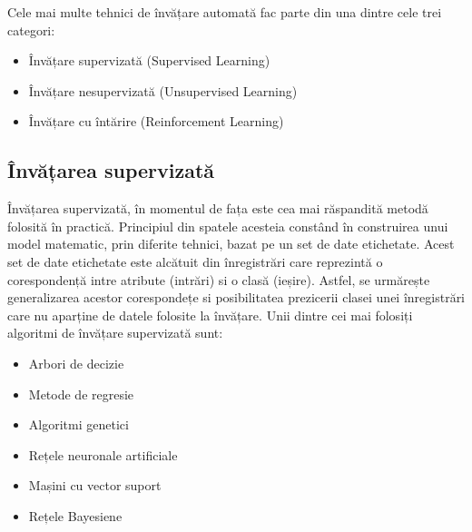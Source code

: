 Cele mai multe tehnici de învățare automată fac parte din una dintre cele trei categori:
\begin{itemize}
	\item Învățare supervizată (Supervised Learning)
	\item Învățare nesupervizată (Unsupervised Learning)
	\item Învățare cu întărire (Reinforcement Learning)
\end{itemize}

\subsection*{Învățarea supervizată}
Învățarea supervizată, în momentul de fața este cea mai răspandită metodă folosită în practică. Principiul din spatele acesteia constând în construirea unui model matematic, prin diferite tehnici, bazat pe un set de date etichetate. Acest set de date etichetate este alcătuit din înregistrări care reprezintă o corespondență intre atribute (intrări) si o clasă (ieșire). Astfel, se urmărește generalizarea acestor corespondețe si posibilitatea prezicerii clasei unei înregistrări care nu aparține de datele folosite la învățare. Unii dintre cei mai folosiți algoritmi de învățare supervizată sunt:
\begin{itemize}
	\item Arbori de decizie
	\item Metode de regresie
	\item Algoritmi genetici
	\item Rețele neuronale artificiale
	\item Mașini cu vector suport
	\item Rețele Bayesiene
\end{itemize}

